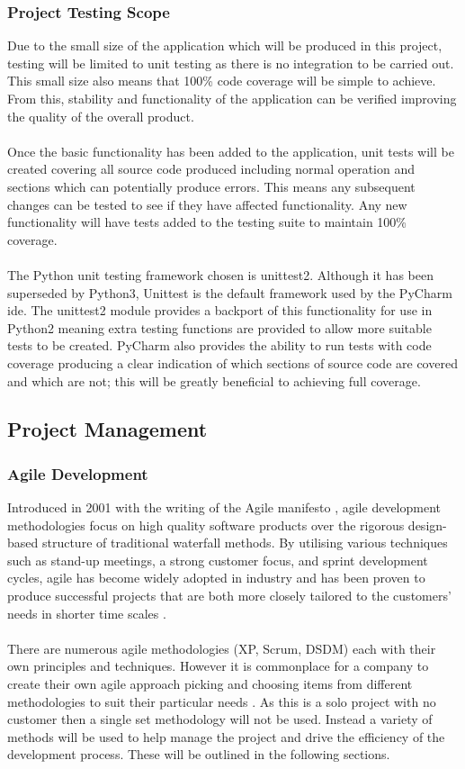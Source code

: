 	\subsubsection{Project Testing Scope}\label{sec:project_testing_scope}
		Due to the small size of the application which will be produced in this project, testing will be limited to unit testing as there is no integration to be carried out. This small size also means that 100\% code coverage will be simple to achieve. From this, stability and functionality of the application can be verified improving the quality of the overall product.
		\\\\
		Once the basic functionality has been added to the application, unit tests will be created covering all source code produced including normal operation and sections which can potentially produce errors. This means any subsequent changes  can be tested to see if they have affected functionality. Any new functionality will have tests added to the testing suite to maintain 100\% coverage.
		\\\\
		The Python unit testing framework chosen is unittest2. Although it has been superseded by Python3, Unittest is the default framework used by the PyCharm \gls{ide}. The unittest2 module provides a backport of this functionality for use in Python2 meaning extra testing functions are provided to allow more suitable tests to be created. PyCharm also provides the ability to run tests with code coverage producing a clear indication of which sections of source code are covered and which are not; this will be greatly beneficial to achieving  full coverage.
\subsection{Project Management}\label{sec:project_management}
	\subsubsection{Agile Development}
		Introduced in 2001 with the writing of the Agile manifesto \citep{beck2001manifesto}, agile development methodologies focus on high quality software products over the rigorous design-based structure of traditional waterfall methods. By utilising various techniques such as stand-up meetings, a strong customer focus, and sprint development cycles, agile has become widely adopted in industry and has been proven to produce successful projects that are both more closely tailored to the customers’ needs in shorter time scales \citep{state_of_agile_2015}.
		\\\\
		There are numerous agile methodologies (XP, Scrum, DSDM) each  with their own principles and techniques. However it is commonplace for a company to create their own agile approach picking and choosing  items from different methodologies to suit their particular needs \citep{aydin2004agile}. As this is a solo project with no customer then a single  set methodology will not be used. Instead a variety of methods will be used to  help  manage the project and drive the efficiency of the development process. These will be outlined in the following sections.

